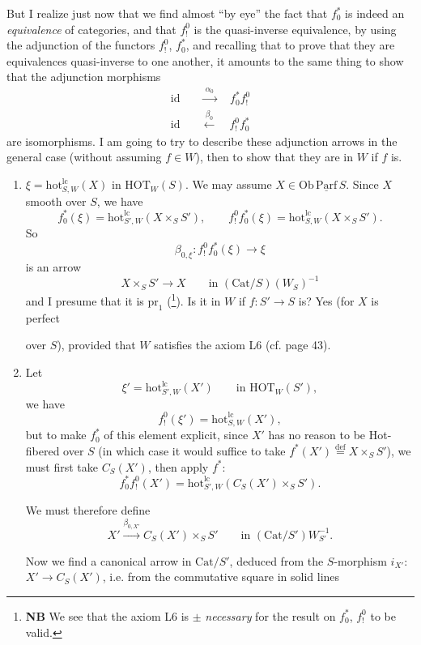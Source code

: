 \documentclass[11pt]{article}
\newcommand{\printedpage}[1]{\marginpar{\footnotesize p.~#1}}
\newcommand{\msp}[1]{\marginpar{\footnotesize [#1]}}
\newcommand{\hot}{\mathrm{hot}}
\newcommand{\HOT}{\mathrm{HOT}}
\newcommand{\Cat}{\mathrm{Cat}}
\begin{document}
\printedpage{98}
\msp{160}
But I realize just now that we find almost ``by eye'' the fact that $f_0^*$ is indeed an \textit{equivalence} of categories, and that $f_!^0$ is the quasi-inverse equivalence, by using the adjunction of the functors $f_!^0$, $f_0^*$, and recalling that to prove that they are equivalences quasi-inverse to one another, it amounts to the same thing to show that the adjunction morphisms
\[\begin{aligned}
\mathrm{id}&\quad\xrightarrow{\ \alpha_0\ }\quad f_0^*f_!^0\\
\mathrm{id}&\quad\xleftarrow{\ \beta_0\ }\quad f_!^0f_0^*
\end{aligned}\]
are isomorphisms. I am going to try to describe these adjunction arrows in the general case (without assuming $f\in W$), then to show that they are in $W$ if $f$ is.

\begin{enumerate}
\item[] $\xi=\hot^{\mathrm{lc}}_{S,W}(X)$ in $\HOT_W(S)$. We may assume $X\in\mathrm{Ob}\,\underline{\mathrm{Parf}}\,S$. Since $X$ smooth over $S$, we have
\[f_0^*(\xi)=\hot^{\mathrm{lc}}_{S',W}(X\times_S S'),\qquad f_!^0f_0^*(\xi)=\hot^{\mathrm{lc}}_{S,W}(X\times_S S').\]
So
\[\beta_{0,\xi} : f_!^0f_0^*(\xi)\longrightarrow\xi\]
is an arrow
\[X\times_S S'\longrightarrow X\qquad\text{in }(\Cat/S)(W_S)^{-1}\]
and I presume that it is $\mathrm{pr}_1$ (\footnote[78]{\textbf{NB} We see that the axiom L6 is $\pm$ \textit{necessary} for the result on $f_0^*$, $f_!^0$ to be valid.}). Is it in $W$ if $f : S'\longrightarrow S$ is? Yes (for $X$ is perfect

\msp{161}

over $S$), provided that $W$ satisfies the axiom L6 (cf. page 43).

\item[2)] Let
\[\xi'=\hot^{\mathrm{lc}}_{S',W}(X')\qquad\text{in }\HOT_W(S'),\]
we have
\[f_!^0(\xi')=\hot^{\mathrm{lc}}_{S,W}(X'),\]
but to make $f_0^*$ of this element explicit, since $X'$ has no reason to be Hot-fibered over $S$ (in which case it would suffice to take $f^*(X')\overset{\text{def}}{=}X\times_S S'$), we must first take $C_S(X')$, then apply $f^*$:
\[f_0^*f_!^0(X')=\hot^{\mathrm{lc}}_{S',W}(C_S(X')\times_S S').\]

We must therefore define
\[X'\xrightarrow{\beta_{0,X'}}C_S(X')\times_S S'\qquad\text{in }(\Cat/S')W_{S'}^{-1}.\]

Now we find a canonical arrow in $\Cat/S'$, deduced from the $S$-morphism $i_{X'}$: $X'\longrightarrow C_S(X')$, i.e. from the commutative square in solid lines
\end{enumerate}
\end{document}
